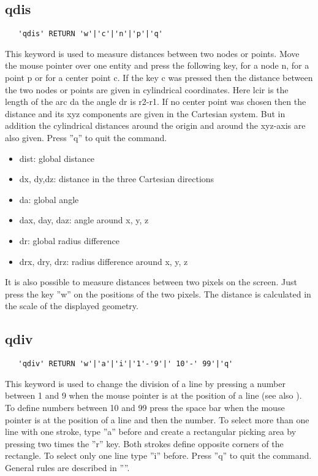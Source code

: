 \documentclass{article}
\begin{document}
\subsection{\label{qdis}qdis}
\begin{verbatim}
   'qdis' RETURN 'w'|'c'|'n'|'p'|'q' 
\end{verbatim}
This keyword is used to measure distances between two nodes or points. Move the mouse pointer over one entity and press the following key, for a node n, for a point p or for a center point c. If the key c was pressed then the distance between the two nodes or points are given in cylindrical coordinates. Here lcir is the length of the arc da the angle dr is r2-r1. If no center point was chosen then the distance and its xyz components are given in the Cartesian system. But in addition the cylindrical distances around the origin and around the xyz-axis are also given. Press ''q'' to quit the command.

\begin{itemize}
\item dist: global distance
\item dx, dy,dz: distance in the three Cartesian directions
\item da: global angle
\item dax, day, daz: angle around x, y, z
\item dr: global radius difference
\item drx, dry, drz: radius difference around x, y, z
\end{itemize}

It is also possible to measure distances between two pixels on the screen. Just press the key ''w'' on the positions of the two pixels. The distance is calculated in the scale of the displayed geometry.

\subsection{\label{qdiv}qdiv}
\begin{verbatim}
   'qdiv' RETURN 'w'|'a'|'i'|'1'-'9'|' 10'-' 99'|'q' 
\end{verbatim}
This keyword is used to change the division of a line by pressing a number between 1 and 9 when the mouse pointer is at the position of a line (see also ). To define numbers between 10 and 99 press the space bar when the mouse pointer is at the position of a line and then the number. To select more than one line with one stroke, type ''a'' before and create a rectangular picking area by pressing two times the ''r'' key. Both strokes define opposite corners of the rectangle. To select only one line type ''i'' before. Press ''q'' to quit the command. General rules are described in ''''. 
\end{document}
